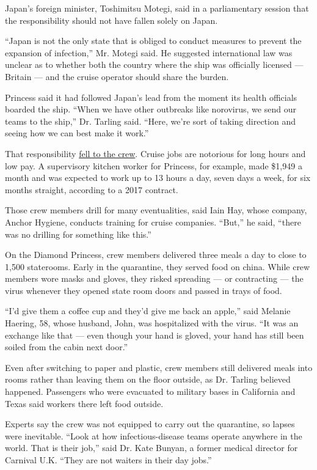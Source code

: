Japan's foreign minister, Toshimitsu Motegi, said in a parliamentary
session that the responsibility should not have fallen solely on Japan.

``Japan is not the only state that is obliged to conduct measures to
prevent the expansion of infection,'' Mr. Motegi said. He suggested
international law was unclear as to whether both the country where the
ship was officially licensed --- Britain --- and the cruise operator
should share the burden.

Princess said it had followed Japan's lead from the moment its health
officials boarded the ship. ``When we have other outbreaks like
norovirus, we send our teams to the ship,'' Dr. Tarling said. ``Here,
we're sort of taking direction and seeing how we can best make it
work.''

That responsibility
\href{https://www.nytimes3xbfgragh.onion/2020/02/10/business/coronavirus-japan-cruise-ship.html}{fell
to the crew}. Cruise jobs are notorious for long hours and low pay. A
supervisory kitchen worker for Princess, for example, made \$1,949 a
month and was expected to work up to 13 hours a day, seven days a week,
for six months straight, according to a 2017 contract.

Those crew members drill for many eventualities, said Iain Hay, whose
company, Anchor Hygiene, conducts training for cruise companies.
``But,'' he said, ``there was no drilling for something like this.''

On the Diamond Princess, crew members delivered three meals a day to
close to 1,500 staterooms. Early in the quarantine, they served food on
china. While crew members wore masks and gloves, they risked spreading
--- or contracting --- the virus whenever they opened state room doors
and passed in trays of food.

``I'd give them a coffee cup and they'd give me back an apple,'' said
Melanie Haering, 58, whose husband, John, was hospitalized with the
virus. ``It was an exchange like that --- even though your hand is
gloved, your hand has still been soiled from the cabin next door.''

Even after switching to paper and plastic, crew members still delivered
meals into rooms rather than leaving them on the floor outside, as Dr.
Tarling believed happened. Passengers who were evacuated to military
bases in California and Texas said workers there left food outside.

Experts say the crew was not equipped to carry out the quarantine, so
lapses were inevitable. ``Look at how infectious-disease teams operate
anywhere in the world. That is their job,'' said Dr. Kate Bunyan, a
former medical director for Carnival U.K. ``They are not waiters in
their day jobs.''

